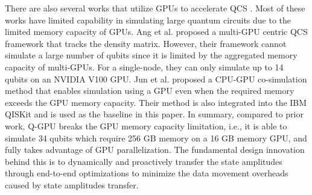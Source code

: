 There are also several works that utilize GPUs to accelerate QCS \cite{zotero-3597,10.1145/3310273.3323053,10.1007/978-3-319-68505-2_8,zotero-3528,10.1109/SC41405.2020.00017,10.1007/978-3-319-27119-4_17,10.1145/2554850.2554892}. Most of these works have limited capability in simulating large quantum circuits due to the limited memory capacity of GPUs. 
Ang et al. \cite{10.1109/SC41405.2020.00017} proposed a multi-GPU centric QCS framework that tracks the density matrix. However, their framework cannot simulate a large number of qubits since it is limited by the aggregated memory capacity of multi-GPUs. For a single-node, they can only simulate up to 14 qubits on an NVIDIA V100 GPU. 
Jun et al. \cite{10.1145/3310273.3323053} proposed a CPU-GPU co-simulation method that enables simulation using a GPU even when the required memory exceeds the GPU memory capacity. Their method is also integrated into the IBM QISKit and is used as the baseline in this paper. 
In summary, compared to prior work, Q-GPU breaks the GPU memory capacity limitation, i.e., it is able to simulate 34 qubits which require 256 GB memory on a 16 GB memory GPU, and fully takes advantage of GPU parallelization. The fundamental design innovation behind this is to dynamically and proactively transfer the state amplitudes through end-to-end optimizations to minimize the data movement overheads caused by state amplitudes transfer.  

